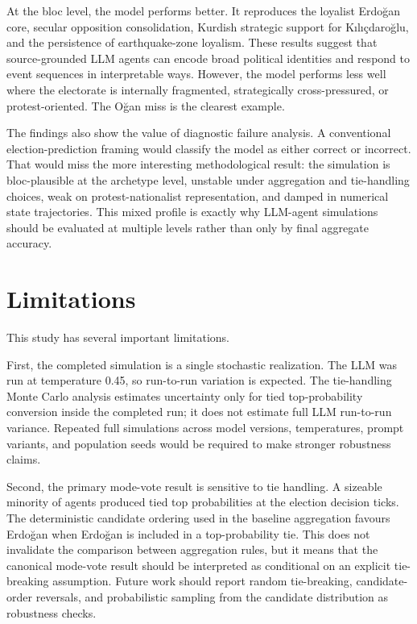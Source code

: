 \documentclass[pdflatex,sn-mathphys-num,iicol]{sn-jnl}
\begin{document}
At the bloc level, the model performs better. It reproduces the loyalist Erdoğan core, secular opposition consolidation, Kurdish strategic support for Kılıçdaroğlu, and the persistence of earthquake-zone loyalism. These results suggest that source-grounded LLM agents can encode broad political identities and respond to event sequences in interpretable ways. However, the model performs less well where the electorate is internally fragmented, strategically cross-pressured, or protest-oriented. The Oğan miss is the clearest example.

The findings also show the value of diagnostic failure analysis. A conventional election-prediction framing would classify the model as either correct or incorrect. That would miss the more interesting methodological result: the simulation is bloc-plausible at the archetype level, unstable under aggregation and tie-handling choices, weak on protest-nationalist representation, and damped in numerical state trajectories. This mixed profile is exactly why LLM-agent simulations should be evaluated at multiple levels rather than only by final aggregate accuracy.

\section{Limitations}\label{sec:limitations}

This study has several important limitations.

First, the completed simulation is a single stochastic realization. The LLM was run at temperature 0.45, so run-to-run variation is expected. The tie-handling Monte Carlo analysis estimates uncertainty only for tied top-probability conversion inside the completed run; it does not estimate full LLM run-to-run variance. Repeated full simulations across model versions, temperatures, prompt variants, and population seeds would be required to make stronger robustness claims.

Second, the primary mode-vote result is sensitive to tie handling. A sizeable minority of agents produced tied top probabilities at the election decision ticks. The deterministic candidate ordering used in the baseline aggregation favours Erdoğan when Erdoğan is included in a top-probability tie. This does not invalidate the comparison between aggregation rules, but it means that the canonical mode-vote result should be interpreted as conditional on an explicit tie-breaking assumption. Future work should report random tie-breaking, candidate-order reversals, and probabilistic sampling from the candidate distribution as robustness checks.
\end{document}
